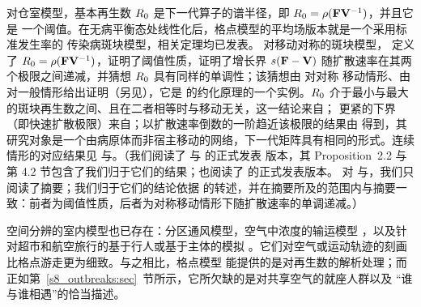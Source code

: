 对仓室模型，基本再生数 $R_0$ 是下一代算子的谱半径\citep{diekmann1990definition}，即 $R_0=\rho(\mathbf{F}\mathbf{V}^{-1})$，并且它是
一个阈值\citep{vandendriessche2002reproduction}。在无病平衡态处线性化后，格点模型的平均场版本就是一个采用标准发生率的
传染病斑块模型，相关定理均已发表。
对移动对称的斑块模型，\citet{allen2007asymptotic} 定义了 $R_0=\rho(\mathbf{F}\mathbf{V}^{-1})$，证明了阈值性质，证明了增长界
$s(\mathbf{F}-\mathbf{V})$ 随扩散速率在其两个极限之间递减，并猜想 $R_0$ 具有同样的单调性；该猜想由\citet{gao2019travel} 对对称
移动情形、由\citet{gao2020fast} 对一般情形给出证明（另见\citet{chen2020asymptotic}），它是\citet{altenberg2012resolvent}
的约化原理的一个实例。$R_0$ 介于最小与最大的斑块再生数之间、且在二者相等时与移动无关，这一结论来自\citet{gao2011sis}；
更紧的下界（即快速扩散极限）来自\citet{gao2020fast}；以扩散速率倒数的一阶趋近该极限的结果由\citet{tien2015disease}
得到，其研究对象是一个由病原体而非宿主移动的网络，下一代矩阵具有相同的形式。连续情形的对应结果见
\citet{allen2008asymptotic} 与\citet{wang2012basic}。（我们阅读了\citet{gao2011sis} 与\citet{tien2015disease} 的正式发表
版本，其 Proposition~2.2 与第 4.2 节包含了我们归于它们的结果；也阅读了\citet{gao2020fast} 的正式发表版本。
对\citet{allen2007asymptotic} 与\citet{gao2019travel}，我们只阅读了摘要；我们归于它们的结论依据\citet{gao2020fast}
的转述，并在摘要所及的范围内与摘要一致：前者为阈值性质，后者为对称移动情形下随扩散速率的单调递减。）

空间分辨的室内模型也已存在：分区通风模型\citep{noakes2009mathematical}，空气中浓度的输运模型
\citep{lau2022predicting,vuorinen2020modelling}，以及针对超市和航空旅行的基于行人或基于主体的模拟
\citep{ying2021modelling,namilae2017multiscale}。它们对空气或运动轨迹的刻画比格点游走更为细致。与之相比，格点模型
能提供的是对再生数的解析处理；而正如第~\ref{s8_outbreaks:sec}~节所示，它所欠缺的是对共享空气的就座人群以及
“谁与谁相遇”的恰当描述。

